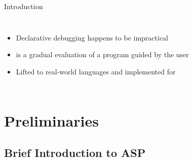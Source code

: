 \documentclass{beamer}
\begin{document}
\begin{frame}{Introduction}
\begin{columns}[b]
		\onslide<+->


		\begin{columns}[b]


			\begin{itemize}
				\item Declarative debugging happens to be impractical
				\onslide<+->
				\item {} is a gradual evaluation of a program guided by the user
				\item Lifted to real-world languages and implemented for \sealion
			\end{itemize}

		\end{columns}

	\end{columns}
	
\end{frame}
% 
% 	
% 	



\section{Preliminaries}


\subsection{Brief Introduction to ASP}
\end{document}
